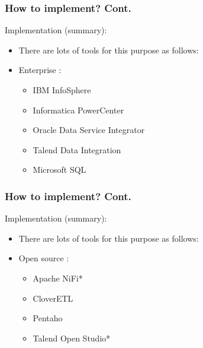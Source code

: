 
\begin{frame}
    \frametitle{How to implement? Cont.}
    \begin{wideitemize}
        \item Implementation (summary):
        \begin{itemize}[<+->]
            \item There are lots of tools for this purpose as follows:
            \item Enterprise \faEdit \space \faArrowCircleORight \space:
            \begin{itemize}
                \item IBM InfoSphere
                \item Informatica PowerCenter
                \item Oracle Data Service Integrator
                \item Talend Data Integration
                \item Microsoft SQL
            \end{itemize}
        \end{itemize}
    \end{wideitemize}
\end{frame}


\begin{frame}
    \frametitle{How to implement? Cont.}
    \begin{wideitemize}
        \item Implementation (summary):
        \begin{itemize}[<+->]
            \item There are lots of tools for this purpose as follows:
            \item Open source \faEdit \space \faArrowCircleORight \space:
            \begin{itemize}
                \item Apache NiFi*
                \item CloverETL
                \item Pentaho
                \item Talend Open Studio*
            \end{itemize}
        \end{itemize}
    \end{wideitemize}
\end{frame}

